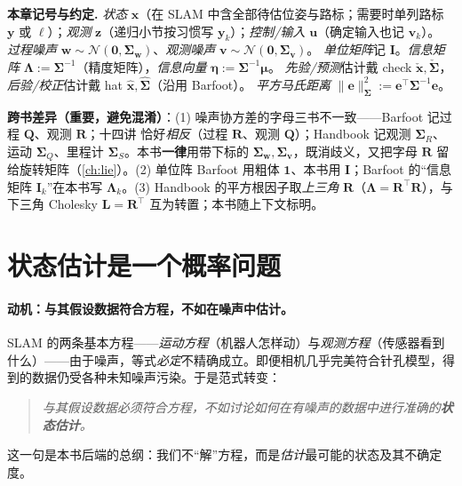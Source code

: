\begin{note}
\textbf{本章记号与约定.}\;
\emph{状态} $\mathbf{x}$（在 SLAM 中含全部待估位姿与路标；需要时单列路标 $\mathbf{y}$ 或 $\boldsymbol{\ell}$）；\emph{观测} $\mathbf{z}$（递归小节按习惯写 $\mathbf{y}_k$）；\emph{控制/输入} $\mathbf{u}$（确定输入也记 $\mathbf{v}_k$）。
\emph{过程噪声} $\mathbf{w}\sim\mathcal{N}(\mathbf{0},\boldsymbol{\Sigma}_{\mathbf{w}})$、\emph{观测噪声} $\mathbf{v}\sim\mathcal{N}(\mathbf{0},\boldsymbol{\Sigma}_{\mathbf{v}})$。
\emph{单位矩阵}记 $\mathbf{I}$。\emph{信息矩阵} $\boldsymbol{\Lambda}:=\boldsymbol{\Sigma}^{-1}$（精度矩阵），\emph{信息向量} $\boldsymbol{\eta}:=\boldsymbol{\Sigma}^{-1}\boldsymbol{\mu}$。
\emph{先验/预测}估计戴 check $\check{\mathbf{x}},\check{\boldsymbol{\Sigma}}$，\emph{后验/校正}估计戴 hat $\hat{\mathbf{x}},\hat{\boldsymbol{\Sigma}}$（沿用 Barfoot\cite{barfoot2024state}）。
\emph{平方马氏距离} $\|\mathbf{e}\|_{\boldsymbol{\Sigma}}^2:=\mathbf{e}^\top\boldsymbol{\Sigma}^{-1}\mathbf{e}$。

\textbf{跨书差异（重要，避免混淆）}：(1) 噪声协方差的字母三书不一致——Barfoot\cite{barfoot2024state} 记过程 $\mathbf{Q}$、观测 $\mathbf{R}$；十四讲\cite{gaoxiang2019slam14} 恰好\emph{相反}（过程 $\mathbf{R}$、观测 $\mathbf{Q}$）；Handbook\cite{carlone2026handbook} 记观测 $\boldsymbol{\Sigma}_R$、运动 $\boldsymbol{\Sigma}_Q$、里程计 $\boldsymbol{\Sigma}_S$。本书\textbf{一律}用带下标的 $\boldsymbol{\Sigma}_{\mathbf{w}},\boldsymbol{\Sigma}_{\mathbf{v}}$，既消歧义，又把字母 $\mathbf{R}$ 留给旋转矩阵（\cref{ch:lie}）。(2) 单位阵 Barfoot 用粗体 $\mathbf{1}$、本书用 $\mathbf{I}$；Barfoot 的“信息矩阵 $\mathbf{I}_k$”在本书写 $\boldsymbol{\Lambda}_k$。(3) Handbook 的平方根因子取\emph{上三角} $\mathbf{R}$（$\boldsymbol{\Lambda}=\mathbf{R}^\top\mathbf{R}$），与下三角 Cholesky $\mathbf{L}=\mathbf{R}^\top$ 互为转置；本书随上下文标明。
\end{note}

\section{状态估计是一个概率问题}
\label{sec:est-why}

\paragraph{动机：与其假设数据符合方程，不如在噪声中估计。}
SLAM 的两条基本方程——\emph{运动方程}（机器人怎样动）与\emph{观测方程}（传感器看到什么）——由于噪声，等式\emph{必定}不精确成立\cite{gaoxiang2019slam14}。即便相机几乎完美符合针孔模型，得到的数据仍受各种未知噪声污染。于是范式转变：
\begin{quote}
\emph{与其假设数据必须符合方程，不如讨论如何在有噪声的数据中进行准确的\textbf{状态估计}。}
\end{quote}
这一句是本书后端的总纲：我们不“解”方程，而是\emph{估计}最可能的状态及其不确定度。

